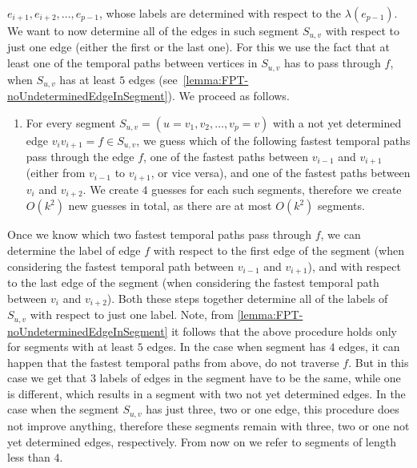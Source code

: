 \documentclass[a4paper,UKenglish,cleveref, autoref, thm-restate]{lipics-v2021}
\newcounter{guesscounter}
\begin{document}
$e_{i+1}, e_{i+2}, \dots, e_{p-1}$, whose labels are determined with respect to the $\lambda(e_{p-1})$.
We want to now determine all of the edges in such segment $S_{u,v}$ with respect to just one edge (either the first or the last one).
For this we use the fact that at least one of the temporal paths between vertices in $S_{u,v}$ has to pass through $f$, when $S_{u,v}$ has at least $5$ edges (see~\cref{lemma:FPT-noUndeterminedEdgeInSegment}).
We proceed as follows.
\begin{enumerate}[G-1.]
    \setcounter{enumi}{\value{guesscounter}}
    \item \label{FPT-guessFTPinSegmentTgroughEdge}
    For every segment $S_{u,v} = (u=v_1, v_2, \dots, v_p=v)$  with a not yet determined edge $v_i v_{i+1} = f \in S_{u,v}$,
    we guess which of the following fastest temporal paths pass through the edge $f$,
    one of the fastest paths between $v_{i-1}$ and $v_{i+1}$ (either from $v_{i-1}$ to $v_{i+1}$, or vice versa), 
    and 
    one of the fastest paths between $v_{i}$ and $v_{i+2}$.
    We create $4$ guesses for each such segments, therefore we create $O(k^2)$ new guesses in total, as there are at most $O(k^2)$ segments.
    \setcounter{guesscounter}{\value{enumi}}
\end{enumerate}
Once we know which two fastest temporal paths pass through $f$, 
we can determine the label of edge $f$ 
with respect to the first edge of the segment (when considering the fastest temporal path between $v_{i-1}$ and $v_{i+1}$),
and with respect to the last edge of the segment (when considering the fastest temporal path between $v_{i}$ and $v_{i+2}$).
Both these steps together determine all of the labels of $S_{u,v}$ with respect to just one label.
Note, from \cref{lemma:FPT-noUndeterminedEdgeInSegment} it follows that the above procedure holds only for segments with at least $5$ edges.
In the case when segment has $4$ edges, it can happen that the fastest temporal paths from above, do not traverse $f$. But in this case we get that $3$ labels of edges in the segment have to be the same, while one is different,
which results in a segment with two not yet determined edges.
In the case when the segment $S_{u,v}$ has just three, two or one edge, this procedure does not improve anything,
therefore these segments remain with three, two or one not yet determined edges, respectively.
From now on we refer to segments of length less than $4$.
\end{document}
